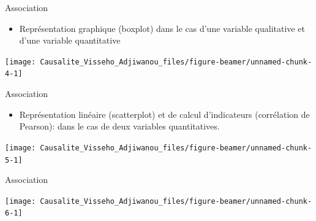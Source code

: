 \documentclass[ignorenonframetext,]{beamer}
\providecommand{\tightlist}{%
  \setlength{\itemsep}{0pt}\setlength{\parskip}{0pt}}
\begin{document}
\begin{frame}{Association}
\protect\hypertarget{association-5}{}

\begin{itemize}
\tightlist
\item
  Représentation graphique (boxplot) dans le cas d'une variable
  qualitative et d'une variable quantitative
\end{itemize}

\texttt{[image: Causalite\_Visseho\_Adjiwanou\_files/figure-beamer/unnamed-chunk-4-1]}

\end{frame}

\begin{frame}{Association}
\protect\hypertarget{association-6}{}

\begin{itemize}
\tightlist
\item
  Représentation linéaire (scatterplot) et de calcul d'indicateurs
  (corrélation de Pearson): dans le cas de deux variables quantitatives.
\end{itemize}

\texttt{[image: Causalite\_Visseho\_Adjiwanou\_files/figure-beamer/unnamed-chunk-5-1]}

\end{frame}

\begin{frame}{Association}
\protect\hypertarget{association-7}{}

\texttt{[image: Causalite\_Visseho\_Adjiwanou\_files/figure-beamer/unnamed-chunk-6-1]}

\end{frame}
\end{document}
